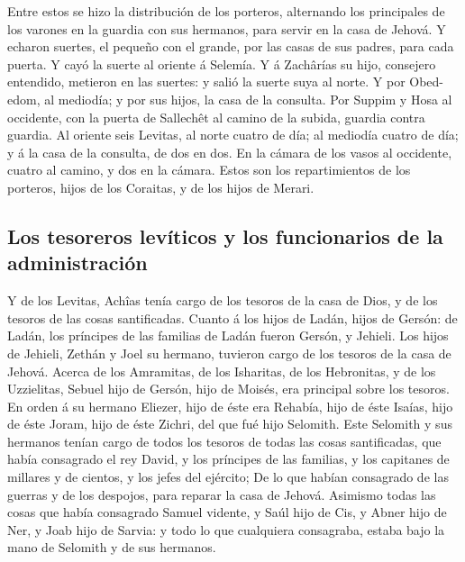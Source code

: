  Entre estos se hizo la distribución de los porteros,
alternando los principales de los varones en la guardia con sus
hermanos, para servir en la casa de Jehová.  Y echaron
suertes, el pequeño con el grande, por las casas de sus padres, para
cada puerta.  Y cayó la suerte al oriente á Selemía. Y á
Zachârías su hijo, consejero entendido, metieron en las suertes: y salió
la suerte suya al norte.  Y por Obed-edom, al mediodía; y
por sus hijos, la casa de la consulta.  Por Suppim y Hosa
al occidente, con la puerta de Sallechêt al camino de la subida, guardia
contra guardia.  Al oriente seis Levitas, al norte cuatro
de día; al mediodía cuatro de día; y á la casa de la consulta, de dos en
dos.  En la cámara de los vasos al occidente, cuatro al
camino, y dos en la cámara.  Estos son los repartimientos
de los porteros, hijos de los Coraitas, y de los hijos de Merari.

\hypertarget{los-tesoreros-levuxedticos-y-los-funcionarios-de-la-administraciuxf3n}{%
\subsection{Los tesoreros levíticos y los funcionarios de la
administración}\label{los-tesoreros-levuxedticos-y-los-funcionarios-de-la-administraciuxf3n}}

 Y de los Levitas, Achîas tenía cargo de los tesoros de la
casa de Dios, y de los tesoros de las cosas santificadas. 
Cuanto á los hijos de Ladán, hijos de Gersón: de Ladán, los príncipes de
las familias de Ladán fueron Gersón, y Jehieli.  Los hijos
de Jehieli, Zethán y Joel su hermano, tuvieron cargo de los tesoros de
la casa de Jehová.  Acerca de los Amramitas, de los
Isharitas, de los Hebronitas, y de los Uzzielitas,  Sebuel
hijo de Gersón, hijo de Moisés, era principal sobre los tesoros.
 En orden á su hermano Eliezer, hijo de éste era Rehabía,
hijo de éste Isaías, hijo de éste Joram, hijo de éste Zichri, del que
fué hijo Selomith.  Este Selomith y sus hermanos tenían
cargo de todos los tesoros de todas las cosas santificadas, que había
consagrado el rey David, y los príncipes de las familias, y los
capitanes de millares y de cientos, y los jefes del ejército;
 De lo que habían consagrado de las guerras y de los
despojos, para reparar la casa de Jehová.  Asimismo todas
las cosas que había consagrado Samuel vidente, y Saúl hijo de Cis, y
Abner hijo de Ner, y Joab hijo de Sarvia: y todo lo que cualquiera
consagraba, estaba bajo la mano de Selomith y de sus hermanos.

